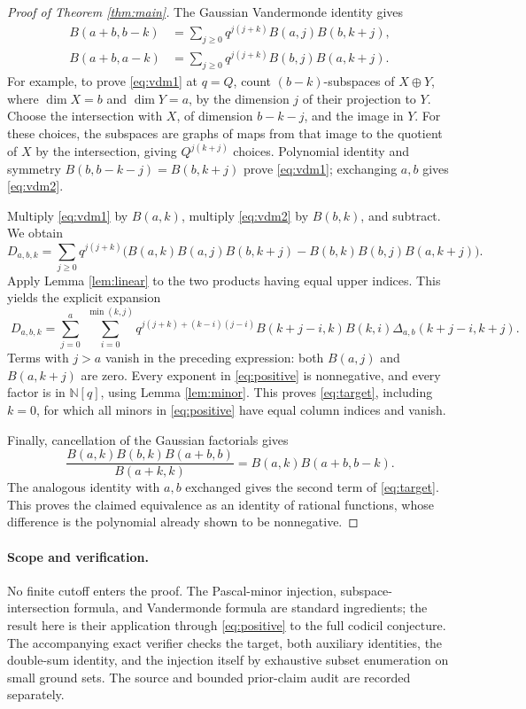 \documentclass[11pt]{article}
\newcommand{\NN}{\mathbb N}
\begin{document}
\begin{proof}[Proof of Theorem \ref{thm:main}]
The Gaussian Vandermonde identity gives
\begin{align}
B(a+b,b-k)&=\sum_{j\ge0}q^{j(j+k)}B(a,j)B(b,k+j),\label{eq:vdm1}\\
B(a+b,a-k)&=\sum_{j\ge0}q^{j(j+k)}B(b,j)B(a,k+j).\label{eq:vdm2}
\end{align}
For example, to prove \eqref{eq:vdm1} at \(q=Q\), count
\((b-k)\)-subspaces of \(X\oplus Y\), where
\(\dim X=b\) and \(\dim Y=a\), by the dimension \(j\) of their
projection to \(Y\). Choose the intersection with \(X\), of dimension
\(b-k-j\), and the image in \(Y\). For these choices, the subspaces
are graphs of maps from that image to the quotient of \(X\) by the
intersection, giving \(Q^{j(k+j)}\) choices.
Polynomial identity and symmetry \(B(b,b-k-j)=B(b,k+j)\) prove
\eqref{eq:vdm1}; exchanging \(a,b\) gives \eqref{eq:vdm2}.

Multiply \eqref{eq:vdm1} by \(B(a,k)\), multiply
\eqref{eq:vdm2} by \(B(b,k)\), and subtract. We obtain
\[
D_{a,b,k}=
\sum_{j\ge0}q^{j(j+k)}
\bigl(B(a,k)B(a,j)B(b,k+j)-B(b,k)B(b,j)B(a,k+j)\bigr).
\]
Apply Lemma \ref{lem:linear} to the two products having equal upper
indices. This yields the explicit expansion
\begin{equation}\label{eq:positive}
\boxed{\;
D_{a,b,k}=
\sum_{j=0}^{a}\ \sum_{i=0}^{\min(k,j)}
q^{j(j+k)+(k-i)(j-i)}
B(k+j-i,k)B(k,i)
\Delta_{a,b}(k+j-i,k+j).
\;}
\end{equation}
Terms with \(j>a\) vanish in the preceding expression:
both \(B(a,j)\) and \(B(a,k+j)\) are zero.
Every exponent in \eqref{eq:positive} is nonnegative, and every
factor is in \(\NN[q]\), using Lemma \ref{lem:minor}.
This proves \eqref{eq:target}, including \(k=0\), for which all
minors in \eqref{eq:positive} have equal column indices and vanish.

Finally, cancellation of the Gaussian factorials gives
\[
\frac{B(a,k)B(b,k)B(a+b,b)}{B(a+k,k)}
=B(a,k)B(a+b,b-k).
\]
The analogous identity with \(a,b\) exchanged gives the second
term of \eqref{eq:target}. This proves the claimed equivalence as
an identity of rational functions, whose difference is the
polynomial already shown to be nonnegative.
\end{proof}

\paragraph{Scope and verification.}
No finite cutoff enters the proof. The Pascal-minor injection,
subspace-intersection formula, and Vandermonde formula are standard
ingredients; the result here is their application through
\eqref{eq:positive} to the full codicil conjecture.
The accompanying exact verifier checks the target, both auxiliary
identities, the double-sum identity, and the injection itself by
exhaustive subset enumeration on small ground sets.
The source and bounded prior-claim audit are recorded separately.
\end{document}
